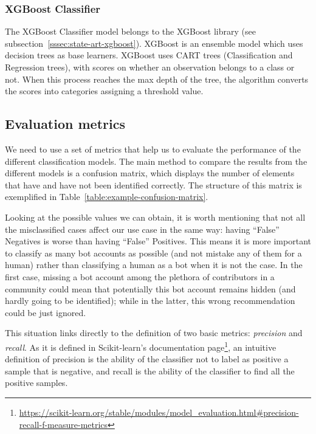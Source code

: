 \documentclass[a4paper, 12pt]{book}
\begin{document}
\subsubsection{XGBoost Classifier}
\label{sssec:xgboost-classifier}

The XGBoost Classifier model belongs to the XGBoost library (see subsection~\ref{sssec:state-art-xgboost}). XGBoost is an ensemble model which uses decision trees as base learners. XGBoost uses CART trees (Classification and Regression trees), with scores on whether an observation belongs to a class or not. When this process reaches the max depth of the tree, the algorithm converts the scores into categories assigning a threshold value.

\subsection{Evaluation metrics}
\label{ssec:evaluation-metrics}

We need to use a set of metrics that help us to evaluate the performance of the different classification models. The main method to compare the results from the different models is a confusion matrix, which displays the number of elements that have and have not been identified correctly. The structure of this matrix is exemplified in Table~\ref{table:example-confusion-matrix}.

Looking at the possible values we can obtain, it is worth mentioning that not all the misclassified cases affect our use case in the same way: having ``False'' Negatives is worse than having ``False'' Positives. This means it is more important to classify as many bot accounts as possible (and not mistake any of them for a human) rather than classifying a human as a bot when it is not the case. In the first case, missing a bot account among the plethora of contributors in a community could mean that potentially this bot account remains hidden (and hardly going to be identified); while in the latter, this wrong recommendation could be just ignored.

This situation links directly to the definition of two basic metrics: \emph{precision} and \emph{recall}. As it is defined in Scikit-learn's documentation page\footnote{\url{https://scikit-learn.org/stable/modules/model_evaluation.html\#precision-recall-f-measure-metrics}}, an intuitive definition of precision is the ability of the classifier not to label as positive a sample that is negative, and recall is the ability of the classifier to find all the positive samples.
\end{document}
